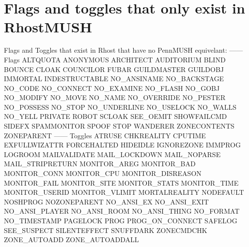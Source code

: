 \documentclass[letterpaper,10pt,english]{sphinxmanual}
\begin{document}
\section{Flags and toggles that only exist in RhostMUSH}
\label{\detokenize{31-comparison:flags-and-toggles-that-only-exist-in-rhostmush}}
\sphinxAtStartPar
Flags and Toggles that exist in Rhost that have no PennMUSH equivelant:
—— Flags
ALTQUOTA                     ANONYMOUS                     ARCHITECT
AUDITORIUM                   BLIND                         BOUNCE
CLOAK                        COUNCILOR                     FUBAR
GUILDMASTER                  GUILDOBJ                      IMMORTAL
INDESTRUCTABLE               NO\_ANSINAME                   NO\_BACKSTAGE
NO\_CODE                      NO\_CONNECT                    NO\_EXAMINE
NO\_FLASH                     NO\_GOBJ                       NO\_MODIFY
NO\_MOVE                      NO\_NAME                       NO\_OVERRIDE
NO\_PESTER                    NO\_POSSESS                    NO\_STOP
NO\_UNDERLINE                 NO\_USELOCK                    NO\_WALLS
NO\_YELL                      PRIVATE                       ROBOT
SCLOAK                       SEE\_OEMIT                     SHOWFAILCMD
SIDEFX                       SPAMMONITOR                   SPOOF
STOP                         WANDERER                      ZONECONTENTS
ZONEPARENT
—— Toggles
ATRUSE                       CHKREALITY                    CPUTIME
EXFULLWIZATTR                FORCEHALTED                   HIDEIDLE
IGNOREZONE                   IMMPROG                       LOGROOM
MAILVALIDATE                 MAIL\_LOCKDOWN                 MAIL\_NOPARSE
MAIL\_STRIPRETURN             MONITOR\_AREG                  MONITOR\_BAD
MONITOR\_CONN                 MONITOR\_CPU                   MONITOR\_DISREASON
MONITOR\_FAIL                 MONITOR\_SITE                  MONITOR\_STATS
MONITOR\_TIME                 MONITOR\_USERID                MONITOR\_VLIMIT
MORTALREALITY                NODEFAULT                     NOSHPROG
NOZONEPARENT                 NO\_ANSI\_EX                    NO\_ANSI\_EXIT
NO\_ANSI\_PLAYER               NO\_ANSI\_ROOM                  NO\_ANSI\_THING
NO\_FORMAT                    NO\_TIMESTAMP                  PAGELOCK
PROG                         PROG\_ON\_CONNECT               SAFELOG
SEE\_SUSPECT                  SILENTEFFECT                  SNUFFDARK
ZONECMDCHK                   ZONE\_AUTOADD                  ZONE\_AUTOADDALL
\end{document}

